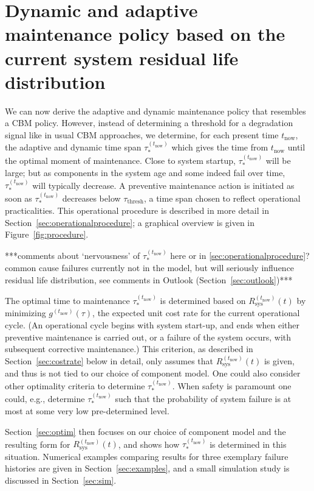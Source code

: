 \documentclass[authoryear]{elsarticle}
\def\tnow{t_\text{now}}
\newcommand{\Rsysnow}{R^{(t_\text{now})}_\text{sys}}
\newcommand{\gnow}{g^{(\tnow)}}
\newcommand{\tausnow}{\tau_*^{(\tnow)}}
\newcommand{\tprep}{\tau_{\text{prep}}}
\newcommand{\tthresh}{\tau_{\text{thresh}}}
\begin{document}
\section{Dynamic and adaptive maintenance policy based on the current system residual life distribution}
\label{sec:policy}

We can now derive the adaptive and dynamic maintenance policy
that resembles a CBM policy.
However, instead of determining a threshold for a degradation signal like in usual CBM approaches,
we determine, for each present time $\tnow$,
the adaptive and dynamic time span $\tausnow$ which gives the time from $\tnow$ until the optimal moment of maintenance.
Close to system startup, $\tausnow$ will be large;
but as components in the system age and some indeed fail over time,
$\tausnow$ will typically decrease.
A preventive maintenance action is initiated
as soon as $\tausnow$ decreases below $\tthresh$,
a time span chosen to reflect operational practicalities.
This operational procedure is described in more detail in Section~\ref{sec:operationalprocedure};
a graphical overview is given in Figure~\ref{fig:procedure}.

***comments about `nervousness' of $\tausnow$ here or in \ref{sec:operationalprocedure}?
common cause failures currently not in the model, but will seriously influence residual life distribution,
see comments in Outlook (Section~\ref{sec:outlook})***

The optimal time to maintenance $\tausnow$ is determined based on $\Rsysnow(t)$
by minimizing $\gnow(\tau)$, the expected unit cost rate for the current operational cycle.
(An operational cycle begins with system start-up,
and ends when either preventive maintenance is carried out,
or a failure of the system occurs, with subsequent corrective maintenance.)
This criterion, as described in Section~\ref{sec:costrate} below in detail,
only assumes that $\Rsysnow(t)$ is given,
and thus is not tied to our choice of component model.
One could also consider other optimality criteria to determine $\tausnow$.
When safety is paramount one could, e.g., determine $\tausnow$ such that
the probability of system failure is at most at some very low pre-determined level.

Section~\ref{sec:optim} then focuses on our choice of component model and the resulting form for $\Rsysnow(t)$,
and shows how $\tausnow$ is determined in this situation.
Numerical examples comparing results for three exemplary failure histories are given in Section~\ref{sec:examples},
and a small simulation study is discussed in Section~\ref{sec:sim}.
\end{document}
